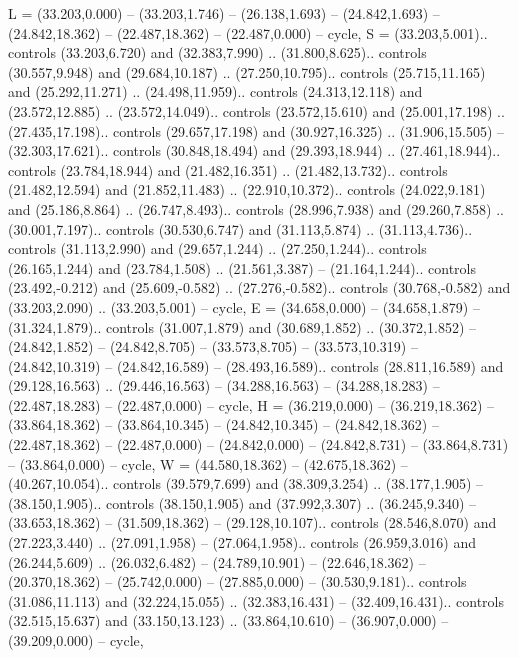 {L} = {(33.203,0.000) -- (33.203,1.746) -- (26.138,1.693) -- (24.842,1.693) -- (24.842,18.362) -- (22.487,18.362) -- (22.487,0.000) -- cycle},
{S} = {(33.203,5.001).. controls (33.203,6.720) and (32.383,7.990) .. (31.800,8.625).. controls (30.557,9.948) and (29.684,10.187) .. (27.250,10.795).. controls (25.715,11.165) and (25.292,11.271) .. (24.498,11.959).. controls (24.313,12.118) and (23.572,12.885) .. (23.572,14.049).. controls (23.572,15.610) and (25.001,17.198) .. (27.435,17.198).. controls (29.657,17.198) and (30.927,16.325) .. (31.906,15.505) -- (32.303,17.621).. controls (30.848,18.494) and (29.393,18.944) .. (27.461,18.944).. controls (23.784,18.944) and (21.482,16.351) .. (21.482,13.732).. controls (21.482,12.594) and (21.852,11.483) .. (22.910,10.372).. controls (24.022,9.181) and (25.186,8.864) .. (26.747,8.493).. controls (28.996,7.938) and (29.260,7.858) .. (30.001,7.197).. controls (30.530,6.747) and (31.113,5.874) .. (31.113,4.736).. controls (31.113,2.990) and (29.657,1.244) .. (27.250,1.244).. controls (26.165,1.244) and (23.784,1.508) .. (21.561,3.387) -- (21.164,1.244).. controls (23.492,-0.212) and (25.609,-0.582) .. (27.276,-0.582).. controls (30.768,-0.582) and (33.203,2.090) .. (33.203,5.001) -- cycle},
{E} = {(34.658,0.000) -- (34.658,1.879) -- (31.324,1.879).. controls (31.007,1.879) and (30.689,1.852) .. (30.372,1.852) -- (24.842,1.852) -- (24.842,8.705) -- (33.573,8.705) -- (33.573,10.319) -- (24.842,10.319) -- (24.842,16.589) -- (28.493,16.589).. controls (28.811,16.589) and (29.128,16.563) .. (29.446,16.563) -- (34.288,16.563) -- (34.288,18.283) -- (22.487,18.283) -- (22.487,0.000) -- cycle},
{H} = {(36.219,0.000) -- (36.219,18.362) -- (33.864,18.362) -- (33.864,10.345) -- (24.842,10.345) -- (24.842,18.362) -- (22.487,18.362) -- (22.487,0.000) -- (24.842,0.000) -- (24.842,8.731) -- (33.864,8.731) -- (33.864,0.000) -- cycle},
{W} = {(44.580,18.362) -- (42.675,18.362) -- (40.267,10.054).. controls (39.579,7.699) and (38.309,3.254) .. (38.177,1.905) -- (38.150,1.905).. controls (38.150,1.905) and (37.992,3.307) .. (36.245,9.340) -- (33.653,18.362) -- (31.509,18.362) -- (29.128,10.107).. controls (28.546,8.070) and (27.223,3.440) .. (27.091,1.958) -- (27.064,1.958).. controls (26.959,3.016) and (26.244,5.609) .. (26.032,6.482) -- (24.789,10.901) -- (22.646,18.362) -- (20.370,18.362) -- (25.742,0.000) -- (27.885,0.000) -- (30.530,9.181).. controls (31.086,11.113) and (32.224,15.055) .. (32.383,16.431) -- (32.409,16.431).. controls (32.515,15.637) and (33.150,13.123) .. (33.864,10.610) -- (36.907,0.000) -- (39.209,0.000) -- cycle},
